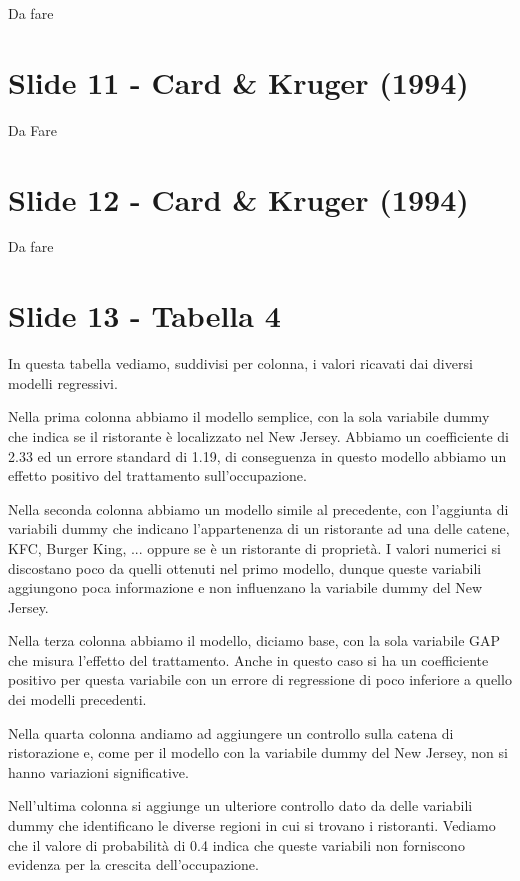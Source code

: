 \documentclass{article}
\begin{document}
Da fare

\section{Slide 11 - Card \& Kruger (1994)}

Da Fare

\section{Slide 12 - Card \& Kruger (1994)}

Da fare

\section{Slide 13 - Tabella 4}

In questa tabella vediamo, suddivisi per colonna, i valori ricavati dai diversi modelli regressivi.

Nella prima colonna abbiamo il modello semplice, con la sola variabile dummy che indica se il ristorante è localizzato nel New Jersey. Abbiamo un coefficiente di 2.33 ed un errore standard di 1.19, di conseguenza in questo modello abbiamo un effetto positivo del trattamento sull'occupazione.

Nella seconda colonna abbiamo un modello simile al precedente, con l'aggiunta di variabili dummy che indicano l'appartenenza di un ristorante ad una delle catene, KFC, Burger King, ... oppure se è un ristorante di proprietà. I valori numerici si discostano poco da quelli ottenuti nel primo modello, dunque queste variabili aggiungono poca informazione e non influenzano la variabile dummy del New Jersey.

Nella terza colonna abbiamo il modello, diciamo base, con la sola variabile GAP che misura l'effetto del trattamento. Anche in questo caso si ha un coefficiente positivo per questa variabile con un errore di regressione di poco inferiore a quello dei modelli precedenti.

Nella quarta colonna andiamo ad aggiungere un controllo sulla catena di ristorazione e, come per il modello con la variabile dummy del New Jersey, non si hanno variazioni significative.

Nell'ultima colonna si aggiunge un ulteriore controllo dato da delle variabili dummy che identificano le diverse regioni in cui si trovano i ristoranti. Vediamo che il valore di probabilità di 0.4 indica che queste variabili non forniscono evidenza per la crescita dell'occupazione.
\end{document}
